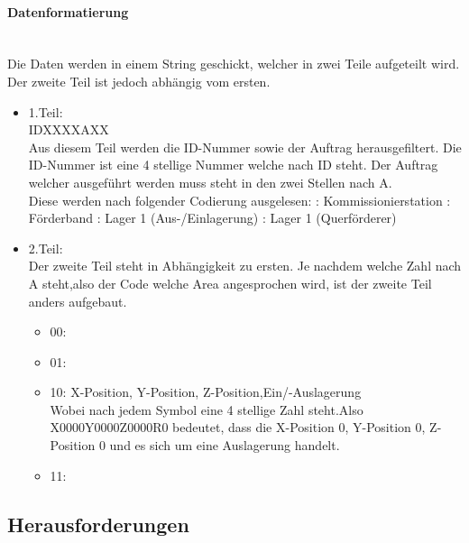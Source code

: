         \paragraph{Datenformatierung}\mbox{}\\
        Die Daten werden in einem String geschickt, welcher in zwei Teile aufgeteilt wird. Der zweite Teil ist jedoch abhängig vom ersten. \\
        
        \begin{itemize}
            \item 1.Teil: \\
            IDXXXXAXX \\
            Aus diesem Teil werden die ID-Nummer sowie der Auftrag herausgefiltert. Die ID-Nummer ist eine 4 stellige Nummer welche nach ID steht. Der Auftrag welcher ausgeführt werden muss steht in den zwei Stellen nach A.\\
            Diese werden nach folgender Codierung ausgelesen:
                : Kommissionierstation
                : Förderband
                : Lager 1 (Aus-/Einlagerung)
                : Lager 1 (Querförderer)
            \item 2.Teil: \\
            Der zweite Teil steht in Abhängigkeit zu ersten. Je nachdem welche Zahl nach A steht,also der Code welche Area angesprochen wird, ist der zweite Teil anders aufgebaut.
                \begin{itemize}
                \item 00: 
                \item 01:
                \item{10: X-Position, Y-Position, Z-Position,Ein/-Auslagerung \\
                Wobei nach jedem Symbol eine 4 stellige Zahl steht.Also X0000Y0000Z0000R0 bedeutet, dass die 
                X-Position 0, Y-Position 0, Z-Position 0 und es sich um eine Auslagerung handelt.}
                \item 11:
                
                \end{itemize}
            
        \end{itemize}

\subsection{Herausforderungen}
